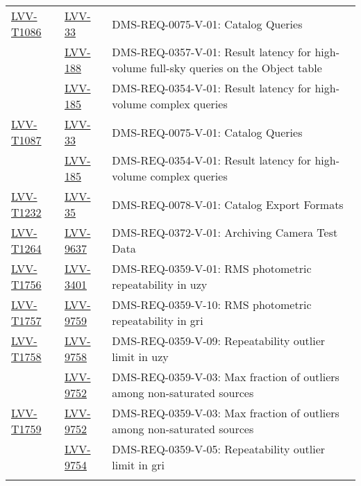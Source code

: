 \begin{longtable}{p{3cm}p{3cm}L{9cm}}
\href{https://jira.lsstcorp.org/secure/Tests.jspa#/testCase/LVV-T1086}{LVV-T1086} &
  \href{https://jira.lsstcorp.org/browse/LVV-33}{LVV-33}
  & DMS-REQ-0075-V-01: Catalog Queries
 \\ 
 &   \href{https://jira.lsstcorp.org/browse/LVV-188}{LVV-188}
  & DMS-REQ-0357-V-01: Result latency for high-volume full-sky queries on
the Object table
 \\ 
 &   \href{https://jira.lsstcorp.org/browse/LVV-185}{LVV-185}
  & DMS-REQ-0354-V-01: Result latency for high-volume complex queries
 \\ 
\hline
\href{https://jira.lsstcorp.org/secure/Tests.jspa#/testCase/LVV-T1087}{LVV-T1087} &
  \href{https://jira.lsstcorp.org/browse/LVV-33}{LVV-33}
  & DMS-REQ-0075-V-01: Catalog Queries
 \\ 
 &   \href{https://jira.lsstcorp.org/browse/LVV-185}{LVV-185}
  & DMS-REQ-0354-V-01: Result latency for high-volume complex queries
 \\ 
\hline
\href{https://jira.lsstcorp.org/secure/Tests.jspa#/testCase/LVV-T1232}{LVV-T1232} &
  \href{https://jira.lsstcorp.org/browse/LVV-35}{LVV-35}
  & DMS-REQ-0078-V-01: Catalog Export Formats
 \\ 
\hline
\href{https://jira.lsstcorp.org/secure/Tests.jspa#/testCase/LVV-T1264}{LVV-T1264} &
  \href{https://jira.lsstcorp.org/browse/LVV-9637}{LVV-9637}
  & DMS-REQ-0372-V-01: Archiving Camera Test Data
 \\ 
\hline
\href{https://jira.lsstcorp.org/secure/Tests.jspa#/testCase/LVV-T1756}{LVV-T1756} &
  \href{https://jira.lsstcorp.org/browse/LVV-3401}{LVV-3401}
  & DMS-REQ-0359-V-01: RMS photometric repeatability in uzy
 \\ 
\hline
\href{https://jira.lsstcorp.org/secure/Tests.jspa#/testCase/LVV-T1757}{LVV-T1757} &
  \href{https://jira.lsstcorp.org/browse/LVV-9759}{LVV-9759}
  & DMS-REQ-0359-V-10: RMS photometric repeatability in gri
 \\ 
\hline
\href{https://jira.lsstcorp.org/secure/Tests.jspa#/testCase/LVV-T1758}{LVV-T1758} &
  \href{https://jira.lsstcorp.org/browse/LVV-9758}{LVV-9758}
  & DMS-REQ-0359-V-09: Repeatability outlier limit in uzy
 \\ 
 &   \href{https://jira.lsstcorp.org/browse/LVV-9752}{LVV-9752}
  & DMS-REQ-0359-V-03: Max fraction of outliers among non-saturated sources
 \\ 
\hline
\href{https://jira.lsstcorp.org/secure/Tests.jspa#/testCase/LVV-T1759}{LVV-T1759} &
  \href{https://jira.lsstcorp.org/browse/LVV-9752}{LVV-9752}
  & DMS-REQ-0359-V-03: Max fraction of outliers among non-saturated sources
 \\ 
 &   \href{https://jira.lsstcorp.org/browse/LVV-9754}{LVV-9754}
  & DMS-REQ-0359-V-05: Repeatability outlier limit in gri
 \\ 
\hline
\end{longtable}

